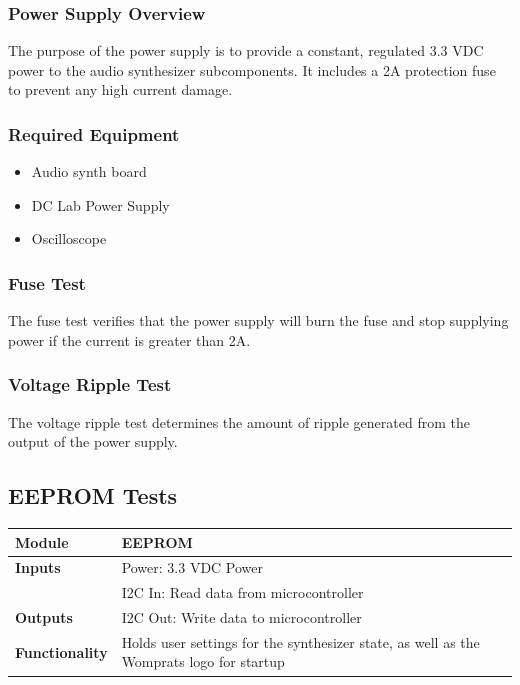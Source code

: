 \documentclass{article}
\begin{document}
\subsubsection{Power Supply Overview}
The purpose of the power supply is to provide a constant, regulated 3.3 VDC power to the audio synthesizer subcomponents.  It includes a 2A protection fuse to prevent any high current damage.
\subsubsection{Required Equipment}
\begin{itemize}
\item Audio synth board
\item DC Lab Power Supply
\item Oscilloscope
\end{itemize}
\subsubsection{Fuse Test}
The fuse test verifies that the power supply will burn the fuse and stop supplying power if the current is greater than 2A.  
\subsubsection{Voltage Ripple Test}
The voltage ripple test determines the amount of ripple generated from the output of the power supply.  

\subsection{EEPROM Tests}

\begin{tabular}{|p{1in}|p{5in}|}
\hline
\textbf{Module} & EEPROM \\
\hline
\textbf{Inputs}& Power: 3.3 VDC Power\\
	     & I2C In: Read data from microcontroller \\
\hline
\textbf{Outputs}& I2C Out: Write data to microcontroller \\ 
\hline
\textbf{Functionality}& Holds user settings for the synthesizer state, as well as the Womprats logo for startup\\
\hline
\end{tabular}
\end{document}
